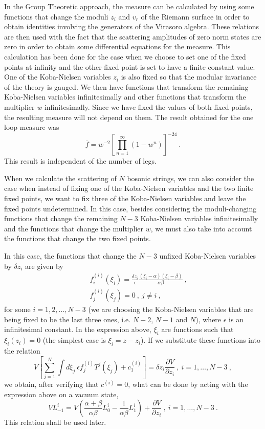 \documentclass[a4paper,12pt]{article}
\begin{document}
In the Group Theoretic approach, the measure can be calculated by using some functions that
change the moduli $z_i$ and $v_r$ of the Riemann surface in order to obtain identities
involving the generators of the Virasoro algebra. These relations are then used with the fact that the scattering amplitudes of zero norm states are zero in order to obtain some
differential equations for the measure. This calculation has been done \cite{2} for the case
when we choose to set one of the fixed points at infinity and the other fixed point is set to have a finite constant value. One of the Koba-Nielsen variables $z_i$ is also fixed so that the modular invariance of the theory is gauged. We then have functions that transform the remaining Koba-Nielsen variables infinitesimally and other functions that transform the
multiplier $w$ infinitesimally. Since we have fixed the values of both fixed points, the
resulting measure will not depend on them. The result obtained for the one loop measure was
\begin{equation}
\bar f=w^{-2}\left[ \prod_{n=1}^\infty (1-w^n)\right] ^{-24}\ .
\end{equation}
This result is independent of the number of legs.

When we calculate the scattering of $N$ bosonic strings, we can also consider the case when
instead of fixing one of the Koba-Nielsen variables and the two finite fixed points, we want
to fix three of the Koba-Nielsen variables and leave the fixed points undetermined. In this
case, besides considering the moduli-changing functions that change the remaining $N-3$
Koba-Nielsen variables infinitesimally and the functions that change the multiplier $w$, we
must also take into account the functions that change the two fixed points.

In this case, the functions that change the $N-3$ unfixed Koba-Nielsen variables by $\delta z_i$ are given by
\begin{eqnarray}
 & & f_i^{(i)}(\xi _i)=\frac{\delta z_i}{\epsilon }\frac{(\xi _i-\alpha )(\xi _i-\beta )}{\alpha \beta }\ ,\\
 & & f_j^{(i)}(\xi _j)=0\ ,\ j\neq i\ ,
\end{eqnarray}
for some $i=1,2,\dots ,N-3$ (we are choosing the Koba-Nielsen variables that are being fixed
to be the last three ones, i.e. $N-2$, $N-1$ and $N$), where $\epsilon $ is an infinitesimal constant. In the expression above, $\xi _i$ are functions such that $\xi _i(z_i)=0$ (the simplest case is $\xi _i=z-z_i$). If we substitute these functions into the relation
\begin{equation}
V\left[ \sum_{j=1}^N\int d\xi _j\ \epsilon f_j^{(i)}T^j(\xi _j)+c_1^{(i)}\right] =\delta
z_i\frac{\partial V}{\partial z_i}\ ,\ i=1,\dots ,N-3\ ,
\end{equation}
we obtain, after verifying that $c^{(i)}=0$, what can be done by acting with the expression above on a vacuum state,
\begin{equation}
\label{eq16}
VL_{-1}^i=V\left( \frac{\alpha +\beta }{\alpha \beta }L_0^i-\frac{1}{\alpha \beta
}L_1^i\right) +\frac{\partial V}{\partial z_i}\ ,\ i=1,\dots ,N-3\ .
\end{equation}
This relation shall be used later.
\end{document}
